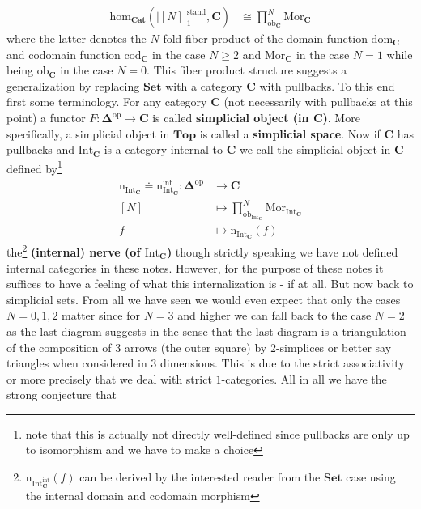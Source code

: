 \begin{cst}[Nerve]
\begin{align*}
  \mathrm{hom}_{\mathbf{Cat}}
  \left(
    \left\vert
      [N]
    \right\vert_{1}^{\textrm{stand}},
    \mathbf{C}
  \right)
  &\cong
  \prod_{\mathrm{ob}_{\mathbf{C}}}^{N}
  \mathrm{Mor}_{\mathbf{C}}
\end{align*}
where the latter denotes the $N$-fold fiber product of the domain function $\mathrm{dom}_{\mathbf{C}}$ and codomain function $\mathrm{cod}_{\mathbf{C}}$ in the case $N \geq 2$ and $\mathrm{Mor}_{\mathbf{C}}$ in the case $N = 1$ while being $\mathrm{ob}_{\mathbf{C}}$ in the case $N = 0$. This fiber product structure suggests a generalization by replacing $\mathbf{Set}$ with a category $\mathbf{C}$ with pullbacks. To this end first some terminology. For any category $\mathbf{C}$ (not necessarily with pullbacks at this point) a functor $F \colon \mathbf{\Delta}^{\mathrm{op}} \rightarrow \mathbf{C}$ is called \textbf{simplicial object (in $\mathbf{C}$)}. More specifically, a simplicial object in $\mathbf{Top}$ is called a \textbf{simplicial space}. Now if $\mathbf{C}$ has pullbacks and $\mathrm{Int}_{\mathbf{C}}$ is a category internal to $\mathbf{C}$ we call the simplicial object in $\mathbf{C}$ defined by\footnote{note that this is actually not directly well-defined since pullbacks are only up to isomorphism and we have to make a choice}
\begin{align*}
  \mathrm{n}_{\mathrm{Int}_{\mathbf{C}}}
  \doteq
  \mathrm{n}_{\mathrm{Int}_{\mathbf{C}}}^{\textrm{int}}
  \colon
  \mathbf{\Delta}^{\mathrm{op}}
  &\rightarrow
  \mathbf{C}
  \\
  [N]
  &\mapsto
  \prod_{\mathrm{ob}_{\mathrm{Int}_{\mathbf{C}}}}^{N}
  \mathrm{Mor}_{\mathrm{Int}_{\mathbf{C}}}
  \\
  f
  &\mapsto
  \mathrm{n}_{\mathrm{Int}_{\mathbf{C}}}(f)
\end{align*}
the\footnote{$\mathrm{n}_{\mathrm{Int}_{\mathbf{C}}^{\textrm{int}}}(f)$ can be derived by the interested reader from the $\mathbf{Set}$ case using the internal domain and codomain morphism} \textbf{(internal) nerve (of $\mathrm{Int}_{\mathbf{C}}$)} though strictly speaking we have not defined internal categories in these notes. However, for the purpose of these notes it suffices to have a feeling of what this internalization is - if at all. But now back to simplicial sets. From all we have seen we would even expect that only the cases $N = 0,1,2$ matter since for $N = 3$ and higher we can fall back to the case $N = 2$ as the last diagram suggests in the sense that the last diagram is a {\glqq}triangulation{\grqq} of the composition of $3$ arrows (the outer square) by $2$-simplices or better say triangles when considered in $3$ dimensions. This is due to the strict associativity or more precisely that we deal with strict $1$-categories. All in all we have the strong conjecture that

\end{cst}
